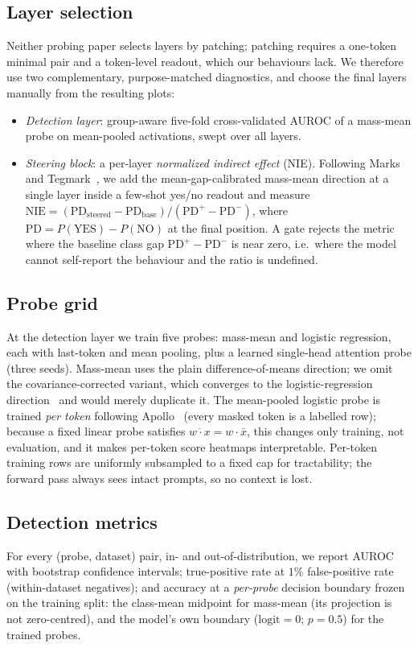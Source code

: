 \documentclass[conference]{IEEEtran}
\begin{document}
\subsection{Layer selection}
Neither probing paper selects layers by patching; patching requires a one-token
minimal pair and a token-level readout, which our behaviours lack. We therefore
use two complementary, purpose-matched diagnostics, and choose the final layers
manually from the resulting plots:
\begin{itemize}
  \item \emph{Detection layer}: group-aware five-fold cross-validated AUROC of a
  mass-mean probe on mean-pooled activations, swept over all layers.
  \item \emph{Steering block}: a per-layer \emph{normalized indirect effect}
  (NIE). Following Marks and Tegmark~\cite{marks2024}, we add the
  mean-gap-calibrated mass-mean direction at a single layer inside a few-shot
  yes/no readout and measure
  $\mathrm{NIE} = (\mathrm{PD}_{\text{steered}} - \mathrm{PD}_{\text{base}}) /
  (\mathrm{PD}^{+} - \mathrm{PD}^{-})$, where $\mathrm{PD} = P(\text{YES}) -
  P(\text{NO})$ at the final position. A gate rejects the metric where the
  baseline class gap $\mathrm{PD}^{+}-\mathrm{PD}^{-}$ is near zero, i.e.\ where
  the model cannot self-report the behaviour and the ratio is undefined.
\end{itemize}

\subsection{Probe grid}
At the detection layer we train five probes: mass-mean and logistic regression,
each with last-token and mean pooling, plus a learned single-head attention
probe (three seeds). Mass-mean uses the plain difference-of-means direction;
we omit the covariance-corrected variant, which converges to the
logistic-regression direction~\cite{marks2024} and would merely duplicate it.
The mean-pooled logistic probe is trained \emph{per token} following
Apollo~\cite{goldowsky2025} (every masked token is a labelled row); because a
fixed linear probe satisfies $\overline{w\cdot x} = w\cdot\bar{x}$, this changes
only training, not evaluation, and it makes per-token score heatmaps
interpretable. Per-token training rows are uniformly subsampled to a fixed cap
for tractability; the forward pass always sees intact prompts, so no context is
lost.

\subsection{Detection metrics}
For every (probe, dataset) pair, in- and out-of-distribution, we report AUROC
with bootstrap confidence intervals; true-positive rate at $1\%$
false-positive rate (within-dataset negatives); and accuracy at a
\emph{per-probe} decision boundary frozen on the training split: the
class-mean midpoint for mass-mean (its projection is not zero-centred), and the
model's own boundary ($\text{logit}=0$; $p=0.5$) for the trained probes.
\end{document}
